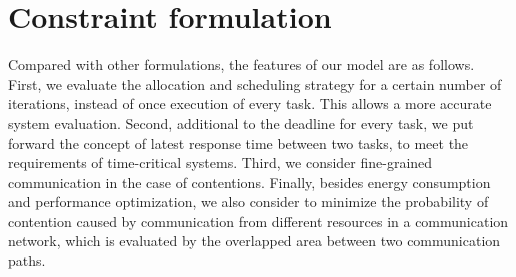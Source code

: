 

\section{Constraint formulation}\label{se:model}
Compared with other formulations, the features of our model are as follows.
First, we evaluate the allocation and scheduling strategy for a certain number of iterations, instead of once execution of every task. This allows a more accurate system evaluation. Second, additional to the deadline for every task, we put forward the concept of latest response time between two tasks, to meet the requirements of time-critical systems. Third, we consider fine-grained communication in the case of contentions. Finally, besides energy consumption and performance optimization, we also consider to minimize the probability of contention caused by communication from different resources in a communication network, which is evaluated by the overlapped area between two communication paths. 


